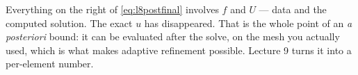 \begin{intuition}
Everything on the right of \eqref{eq:l8postfinal} involves $f$ and $U$ --- data
and the computed solution. The exact $u$ has disappeared. That is the whole
point of an \emph{a posteriori} bound: it can be evaluated after the solve, on
the mesh you actually used, which is what makes adaptive refinement possible.
Lecture 9 turns it into a per-element number.
\end{intuition}
